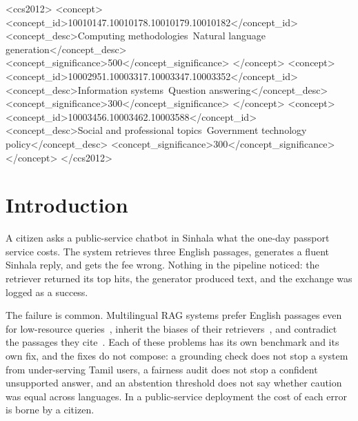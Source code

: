 \begin{CCSXML}
<ccs2012>
   <concept>
       <concept_id>10010147.10010178.10010179.10010182</concept_id>
       <concept_desc>Computing methodologies~Natural language generation</concept_desc>
       <concept_significance>500</concept_significance>
       </concept>
   <concept>
       <concept_id>10002951.10003317.10003347.10003352</concept_id>
       <concept_desc>Information systems~Question answering</concept_desc>
       <concept_significance>300</concept_significance>
       </concept>
   <concept>
       <concept_id>10003456.10003462.10003588</concept_id>
       <concept_desc>Social and professional topics~Government technology policy</concept_desc>
       <concept_significance>300</concept_significance>
       </concept>
 </ccs2012>
\end{CCSXML}



\maketitle

\section{Introduction}
A citizen asks a public-service chatbot in Sinhala what the one-day passport service costs. The system retrieves three English passages, generates a fluent Sinhala reply, and gets the fee wrong. Nothing in the pipeline noticed: the retriever returned its top hits, the generator produced text, and the exchange was logged as a success.

The failure is common. Multilingual RAG systems prefer English passages even for low-resource queries~\cite{park2025langpref}, inherit the biases of their retrievers~\cite{wu2024ragfair}, and contradict the passages they cite~\cite{niu2024ragtruth}. Each of these problems has its own benchmark and its own fix, and the fixes do not compose: a grounding check does not stop a system from under-serving Tamil users, a fairness audit does not stop a confident unsupported answer, and an abstention threshold does not say whether caution was equal across languages. In a public-service deployment the cost of each error is borne by a citizen.

